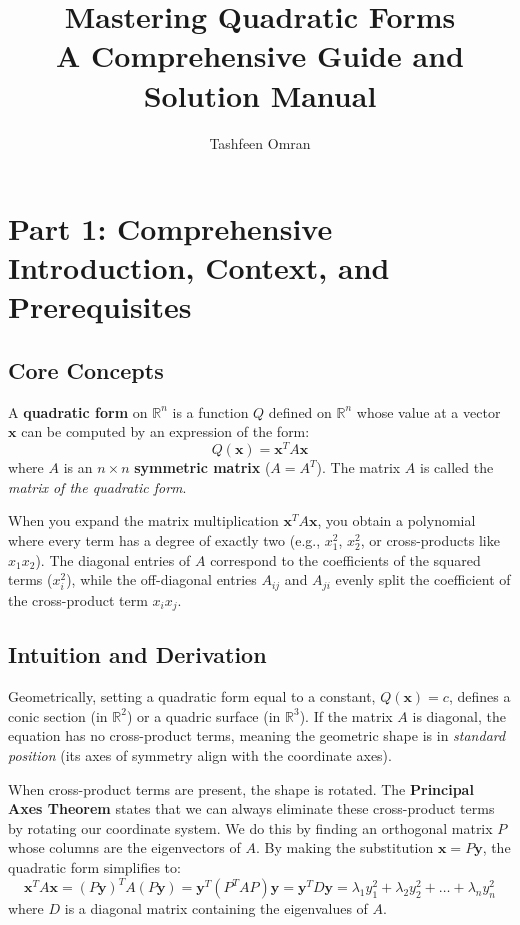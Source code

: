 \documentclass[11pt, letterpaper]{article}
\title{\Huge \textbf{Mastering Quadratic Forms} \\ \Large A Comprehensive Guide and Solution Manual}
\author{Tashfeen Omran}
\date{}
\theoremstyle{definition}
\theoremstyle{remark}
\newcommand{\R}{\mathbb{R}}
\newcommand{\x}{\mathbf{x}}
\newcommand{\y}{\mathbf{y}}
\begin{document}
\maketitle
\tableofcontents
\newpage

\section{Part 1: Comprehensive Introduction, Context, and Prerequisites}

\subsection{Core Concepts}
A \textbf{quadratic form} on $\R^n$ is a function $Q$ defined on $\R^n$ whose value at a vector $\x$ can be computed by an expression of the form:
\[
Q(\x) = \x^T A \x
\]
where $A$ is an $n \times n$ \textbf{symmetric matrix} ($A = A^T$). The matrix $A$ is called the \textit{matrix of the quadratic form}. 

When you expand the matrix multiplication $\x^T A \x$, you obtain a polynomial where every term has a degree of exactly two (e.g., $x_1^2$, $x_2^2$, or cross-products like $x_1 x_2$). The diagonal entries of $A$ correspond to the coefficients of the squared terms ($x_i^2$), while the off-diagonal entries $A_{ij}$ and $A_{ji}$ evenly split the coefficient of the cross-product term $x_i x_j$.

\subsection{Intuition and Derivation}
Geometrically, setting a quadratic form equal to a constant, $Q(\x) = c$, defines a conic section (in $\R^2$) or a quadric surface (in $\R^3$). If the matrix $A$ is diagonal, the equation has no cross-product terms, meaning the geometric shape is in \textit{standard position} (its axes of symmetry align with the coordinate axes). 

When cross-product terms are present, the shape is rotated. The \textbf{Principal Axes Theorem} states that we can always eliminate these cross-product terms by rotating our coordinate system. We do this by finding an orthogonal matrix $P$ whose columns are the eigenvectors of $A$. By making the substitution $\x = P\y$, the quadratic form simplifies to:
\[
\x^T A \x = (P\y)^T A (P\y) = \y^T (P^T A P) \y = \y^T D \y = \lambda_1 y_1^2 + \lambda_2 y_2^2 + \dots + \lambda_n y_n^2
\]
where $D$ is a diagonal matrix containing the eigenvalues of $A$.
\end{document}
